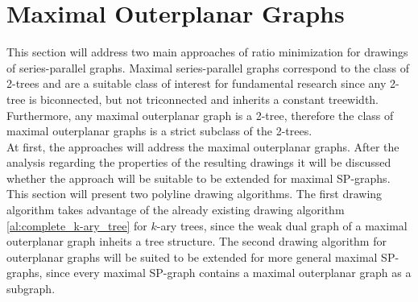 \section{Maximal Outerplanar Graphs}\label{s:maximal_outerplanar}

This section will address two main approaches of ratio minimization for drawings of series-parallel graphs. Maximal series-parallel graphs correspond to the class of 2-trees \cite[P. 2]{straight-line_2-trees} and are a suitable class of interest for fundamental research since any 2-tree is biconnected, but not triconnected and inherits a constant treewidth. Furthermore, any maximal outerplanar graph is a 2-tree, therefore the class of maximal outerplanar graphs is a strict subclass of the 2-trees.\\
At first, the approaches will address the maximal outerplanar graphs. After the analysis regarding the properties of the resulting drawings it will be discussed whether the approach will be suitable to be extended for maximal SP-graphs. This section will present two polyline drawing algorithms. The first drawing algorithm takes advantage of the already existing drawing algorithm \ref{al:complete_k-ary_tree} for $k$-ary trees, since the weak dual graph of a maximal outerplanar graph inheits a tree structure. The second drawing algorithm for outerplanar graphs will be suited to be extended for more general maximal SP-graphs, since every maximal SP-graph contains a maximal outerplanar graph as a subgraph.


